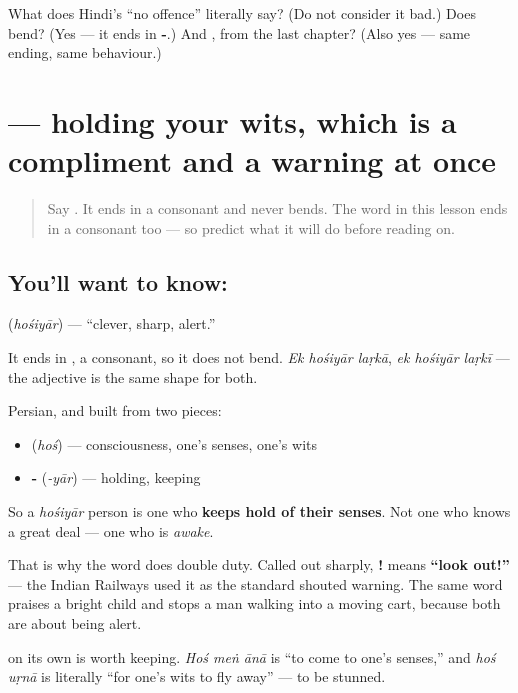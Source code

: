 \begin{tcolorbox}[breakable,colback=teal!4,colframe=teal!35!black,title={Before you move on}]
What does Hindi's \textquotedblleft{}no offence\textquotedblright{} literally say? (Do not consider it bad.) Does \textbf{} bend? (Yes — it ends in \textbf{-}.) And \textbf{}, from the last chapter? (Also yes — same ending, same behaviour.)
\end{tcolorbox}
\section[\texorpdfstring{\hi{होशियार} (hośiyār)}{होशियार (hośiyār)}]{ — holding your wits, which is a compliment and a warning at once}

\label{lesson:HI-C83-hoshiyaar}



\begin{quote}
Say \textbf{}. It ends in a consonant and never bends. The word in this lesson ends in a consonant too — so predict what it will do before reading on.
\end{quote}

\subsection*{You'll want to know: }
\textbf{} (\emph{hośiyār}) — \textquotedblleft{}clever, sharp, alert.\textquotedblright{}

It ends in \textbf{}, a consonant, so it does not bend. \emph{Ek hośiyār laṛkā}, \emph{ek hośiyār laṛkī} — the adjective is the same shape for both.

\begin{cousinweb}
Persian, and built from two pieces:

\begin{itemize}
\raggedright
  \item \textbf{} (\emph{hoś}) — consciousness, one's senses, one's wits
  \item \textbf{-} (\emph{-yār}) — holding, keeping
\end{itemize}

So a \emph{hośiyār} person is one who \textbf{keeps hold of their senses}. Not one who knows a great deal — one who is \emph{awake}.

That is why the word does double duty. Called out sharply, \textbf{!} means \textbf{\textquotedblleft{}look out!\textquotedblright{}} — the Indian Railways used it as the standard shouted warning. The same word praises a bright child and stops a man walking into a moving cart, because both are about being alert.

\textbf{} on its own is worth keeping. \emph{Hoś meṅ ānā} is \textquotedblleft{}to come to one's senses,\textquotedblright{} and \emph{hoś uṛnā} is literally \textquotedblleft{}for one's wits to fly away\textquotedblright{} — to be stunned.
\end{cousinweb}


